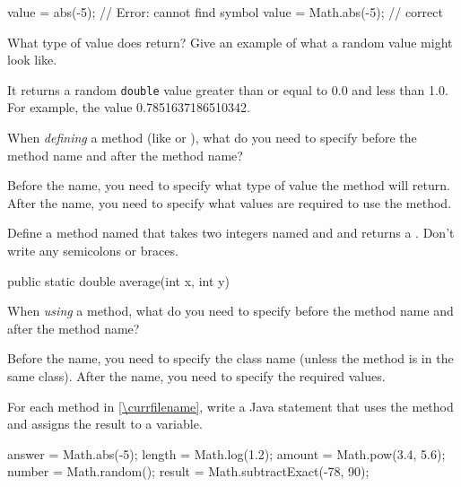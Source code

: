 \smallskip
\begin{javalst}
    value = abs(-5);       // Error: cannot find symbol
    value = Math.abs(-5);  // correct
\end{javalst}
\smallskip





\Q What type of value does  return? Give an example of what a random value might look like.

\begin{answer}[3em]
It returns a random \texttt{double} value greater than or equal to 0.0 and less than 1.0.
For example, the value 0.7851637186510342.
\end{answer}


\Q When {\it defining} a method (like  or ), what do you need to specify before the method name and after the method name?

\begin{answer}
Before the name, you need to specify what type of value the method will return.
After the name, you need to specify what values are required to use the method.
\end{answer}


\Q \label{methsig}
Define a method named  that takes two integers named  and  and returns a . Don't write any semicolons or braces.

\begin{answer}[3em]
\begin{javaans}
public static double average(int x, int y)
\end{javaans}
\end{answer}


\Q When {\it using} a method, what do you need to specify before the method name and after the method name?

\begin{answer}
Before the name, you need to specify the class name (unless the method is in the same class).
After the name, you need to specify the required values.
\end{answer}


\Q For each method in \ref{\currfilename}, write a Java statement that uses the method and assigns the result to a variable.

\begin{answer}[7em]
\begin{javaans}
answer = Math.abs(-5);
length = Math.log(1.2);
amount = Math.pow(3.4, 5.6);
number = Math.random();
result = Math.subtractExact(-78, 90);
\end{javaans}
\end{answer}


